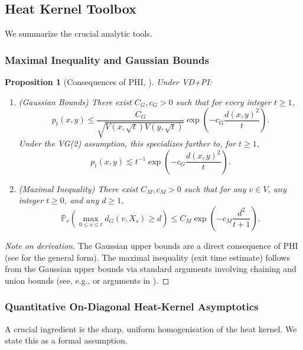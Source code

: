 \documentclass[reqno]{amsart}
\numberwithin{equation}{section}
\newtheorem{proposition}[proposition]{Proposition}
\theoremstyle{definition}
\theoremstyle{remark}
\newcommand{\Prob}{\mathbb{P}}
\begin{document}
\subsection{Heat Kernel Toolbox}
We summarize the crucial analytic tools.

\subsubsection{Maximal Inequality and Gaussian Bounds}


\begin{proposition}[Consequences of PHI, \cite{Delmotte99, Grigoryan09}]\label{prop:maximal}
Under VD+PI:
\begin{enumerate}

    \item (Gaussian Bounds) There exist $C_G, c_G > 0$ such that for every integer $t\ge 1$,
    \[
    p_t(x,y) \leq \frac{C_G}{\sqrt{V(x,\sqrt{t}) V(y,\sqrt{t})}} \exp\left(-c_G \frac{d(x,y)^2}{t}\right).
    \]
    Under the VG(2) assumption, this specializes further to, for $t\ge 1$,
    \[
    p_t(x,y) \lesssim t^{-1} \exp\left(-c_G \frac{d(x,y)^2}{t}\right).
    \]
    \item (Maximal Inequality) There exist $C_M,c_M > 0$ such that for any $v \in V$, any integer $t \geq 0$, and any $d \geq 1$,
    {\small
    \begin{equation}\label{eq:max_ineq}
    \Prob_v\left( \max_{0 \leq s \leq t} d_G(v,X_s) \geq d \right) \leq C_M \exp\left(-c_M \frac{d^2}{t+1}\right).
    \end{equation}}
\end{enumerate}
\end{proposition}
\begin{proof}[Note on derivation]
The Gaussian upper bounds are a direct consequence of PHI (see \cite{Delmotte99} for the general form). The maximal inequality (exit time estimate) follows from the Gaussian upper bounds via standard arguments involving chaining and union bounds (see, e.g., \cite[Theorem 5.5.3]{Grigoryan09} or arguments in \cite{Delmotte99}).
\end{proof}


\subsubsection{Quantitative On-Diagonal Heat-Kernel Asymptotics}
A crucial ingredient is the sharp, uniform homogenisation of the heat kernel. We state this as a formal assumption.
\end{document}
